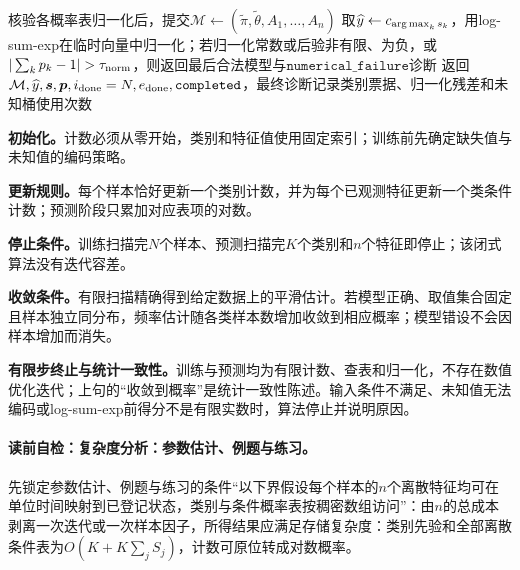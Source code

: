 \begin{AlgorithmContract}
\begin{algorithm}[H]
核验各概率表归一化后，提交$\mathcal M\leftarrow(\widetilde\pi,\widetilde\theta,A_1,\ldots,A_n)$\;
取$\widehat y\leftarrow c_{\operatorname*{arg\,max}_k s_k}$，用log-sum-exp在临时向量中归一化；若归一化常数或后验非有限、为负，或$|\sum_kp_k-1|>\tau_{\rm norm}$，则返回最后合法模型与$\mathtt{numerical\_failure}$诊断\;
返回$\mathcal M,\widehat y,\boldsymbol s,\boldsymbol p,i_{\rm done}=N,e_{\rm done},\mathtt{completed}$，最终诊断记录类别票据、归一化残差和未知桶使用次数\;
\end{algorithm}
\end{AlgorithmContract}

\label{struct:V2-C03-CH22}
\textbf{初始化。}计数必须从零开始，类别和特征值使用固定索引；训练前先确定缺失值与未知值的编码策略。

\label{struct:V2-C03-CH23}
\textbf{更新规则。}每个样本恰好更新一个类别计数，并为每个已观测特征更新一个类条件计数；预测阶段只累加对应表项的对数。

\label{struct:V2-C03-CH24}
\textbf{停止条件。}训练扫描完$N$个样本、预测扫描完$K$个类别和$n$个特征即停止；该闭式算法没有迭代容差。

\label{struct:V2-C03-CH25}
\textbf{收敛条件。}有限扫描精确得到给定数据上的平滑估计。若模型正确、取值集合固定且样本独立同分布，频率估计随各类样本数增加收敛到相应概率；模型错设不会因样本增加而消失。

\textbf{有限步终止与统计一致性。}训练与预测均为有限计数、查表和归一化，不存在数值优化迭代；上句的“收敛到概率”是统计一致性陈述。输入条件不满足、未知值无法编码或log-sum-exp前得分不是有限实数时，算法停止并说明原因。

\label{struct:V2-C03-CH26}
\label{struct:V2-C03-CH27}
\paragraph{读前自检：复杂度分析：参数估计、例题与练习。}先锁定参数估计、例题与练习的条件“以下界假设每个样本的$n$个离散特征均可在单位时间映射到已登记状态，类别与条件概率表按稠密数组访问”：由$n$的总成本剥离一次迭代或一次样本因子，所得结果应满足存储复杂度：类别先验和全部离散条件表为$O(K+K\sum_jS_j)$，计数可原位转成对数概率。\par

